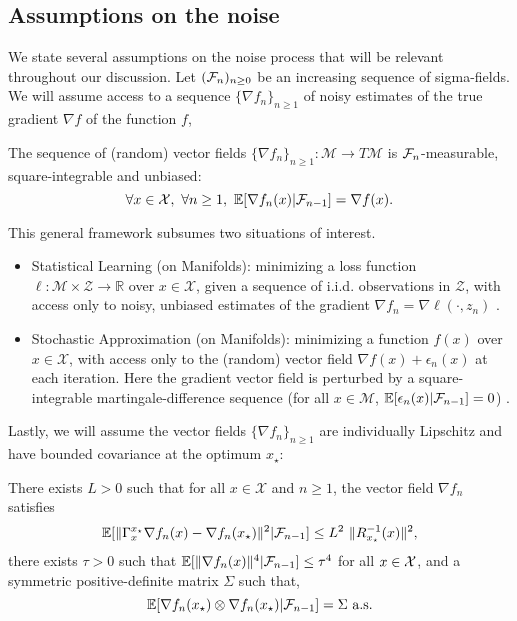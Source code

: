 \subsection{Assumptions on the noise} \label{sec:assumptions_noise}
\vspace{-.0856cm}
We state several assumptions on the noise process that will be relevant throughout our discussion.
Let $(\mathcal{F}_n)_{n \geq 0}$ be an increasing sequence of sigma-fields. We will assume access to a sequence $\{\nabla f_n\}_{n \geq 1}$
of noisy estimates of the true gradient $\nabla f$ of the function $f$,
\begin{assumption} \label{assump:noiseunbiased}
The sequence of (random) vector fields $\{ \nabla f_n \}_{n\geq1} : \mathcal M \to T\mathcal M$ is $\mathcal{F}_n$-measurable, square-integrable and unbiased:
    \[
\forall x \in \mathcal{X}, \ \forall n \geq 1, \ \mathbb{E}[\nabla f_n(x)\vert \mathcal{F}_{n-1}]=\nabla f(x).
\]
\end{assumption}
This general framework subsumes two situations of interest.
\begin{itemize}
 \vspace*{-6pt}
 \item
Statistical Learning (on Manifolds): minimizing a loss function $\ell: \mathcal M \times  \mathcal Z \to \mathbb R$ over $x \in \mathcal X$, given a sequence
of i.i.d. observations in $\mathcal Z$, with access only to noisy, unbiased estimates of the gradient $\nabla f_n=\nabla \ell(\cdot,z_n)$ \citep{AswBicTom11}.
\vspace*{-6pt}
\item
Stochastic Approximation (on Manifolds): minimizing a function $f(x)$ over $x \in \mathcal X$, with access only to the
(random) vector field $\nabla f(x) + \epsilon_n(x)$ at each iteration. Here the gradient vector field is perturbed
 by a square-integrable martingale-difference sequence (for all $x\in\mathcal M $, $\mathbb{E}[\epsilon_n(x) \vert \mathcal{F}_{n-1}]=0$) \citep{bonnabel2013stochastic}.
\end{itemize}
Lastly, we will assume the vector fields $\{\nabla f_n\}_{n \geq 1}$ are individually Lipschitz and have
bounded covariance at the optimum $x_\star$:
\vspace*{-4pt}
\begin{assumption} \label{assump:noiseLip}
 There exists $L > 0$ such that for all $x \in \mathcal X$ and $n\geq 1$, the vector field $\nabla f_n$ satisfies
\[ \mathbb{E} [\Vert  \Gamma_{x}^{x_\star} \nabla f_n(x)- \nabla f_n(x_\star)\Vert^2\vert  \mathcal{F}_{n-1}]\leq L^2 \ \Vert R_{x_\star}^{-1}(x) \Vert^2 ,
 \]
there exists $\tau>0$ such that $ \mathbb{E} [\Vert  \nabla f_{n}(x) \Vert^4\vert  \mathcal{F}_{n-1}]\leq \tau^4$ for all $x \in \mathcal{X}$, and a symmetric positive-definite matrix $\Sigma$ such that,
 \[
 \mathbb{E}[\nabla f_n(x_\star) \otimes \nabla f_n(x_\star) \vert\mathcal F_{n-1}] = \Sigma \text{ a.s.} \]
\end{assumption}
